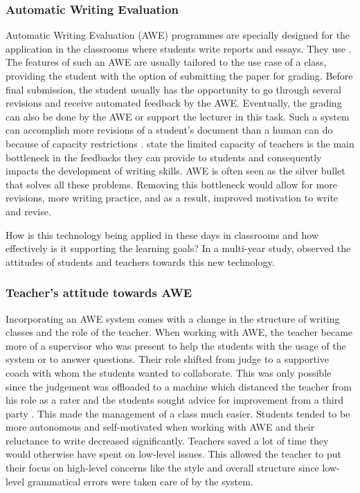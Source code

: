 \documentclass[runningheads]{llncs}
\begin{document}
\subsubsection{Automatic Writing Evaluation}
Automatic Writing Evaluation (AWE) \citep{grimes_utility_2010} programmes are specially designed for the application in the classrooms where students write reports and essays. They use  .
The features of such an AWE are usually tailored to the use case of a class, providing the student with the option of submitting the paper for grading. Before final submission, the student usually has the opportunity to go through several revisions and receive automated feedback by the AWE. Eventually, the grading can also be done by the AWE or support the lecturer in this task. Such a system can accomplish more revisions of a student's document than a human can do because of capacity restrictions \citep{warschauer_automated_2006}. \textcite{grimes_utility_2010} state the limited capacity of teachers is the main bottleneck in the feedbacks they can provide to students and consequently impacts the development of writing skills. AWE is often seen as the silver bullet that solves all these problems. Removing this bottleneck would allow for more revisions, more writing practice, and as a result, improved motivation to write and revise.        

How is this technology being applied in these days in classrooms and how effectively is it supporting the learning goals? In a multi-year study, \textcite{grimes_utility_2010} observed the attitudes of students and teachers towards this new technology. 

\subsubsection{Teacher's attitude towards AWE}
Incorporating an AWE system comes with a change in the structure of writing classes and the role of the teacher. When working with AWE, the teacher became more of a supervisor who was present to help the students with the usage of the system or to answer questions. Their role shifted from judge to a supportive coach with whom the students wanted to collaborate. This was only possible since the judgement was offloaded to a machine which distanced the teacher from his role as a rater and the students sought advice for improvement from a third party \citep{grimes_utility_2010}. This made the management of a class much easier. Students tended to be more autonomous and self-motivated when working with AWE and their reluctance to write decreased significantly. Teachers saved a lot of time they would otherwise have spent on low-level issues. This allowed the teacher to put their focus on high-level concerns like the style and overall structure since low-level grammatical errors were taken care of by the system.
\end{document}
